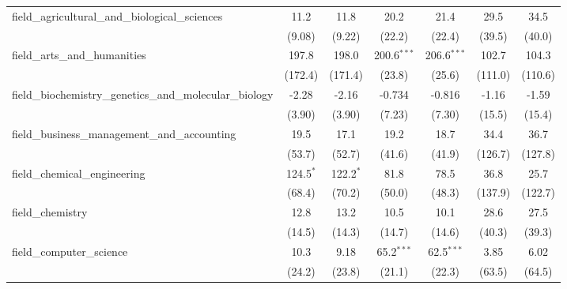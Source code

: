 \begin{tabular}{lcccccc}
   field\_agricultural\_and\_biological\_sciences              & 11.2         & 11.8         & 20.2           & 21.4           & 29.5    & 34.5\\   
                                                               & (9.08)       & (9.22)       & (22.2)         & (22.4)         & (39.5)  & (40.0)\\   
   field\_arts\_and\_humanities                                & 197.8        & 198.0        & 200.6$^{***}$  & 206.6$^{***}$  & 102.7   & 104.3\\   
                                                               & (172.4)      & (171.4)      & (23.8)         & (25.6)         & (111.0) & (110.6)\\   
   field\_biochemistry\_genetics\_and\_molecular\_biology      & -2.28        & -2.16        & -0.734         & -0.816         & -1.16   & -1.59\\   
                                                               & (3.90)       & (3.90)       & (7.23)         & (7.30)         & (15.5)  & (15.4)\\   
   field\_business\_management\_and\_accounting                & 19.5         & 17.1         & 19.2           & 18.7           & 34.4    & 36.7\\   
                                                               & (53.7)       & (52.7)       & (41.6)         & (41.9)         & (126.7) & (127.8)\\   
   field\_chemical\_engineering                                & 124.5$^{*}$  & 122.2$^{*}$  & 81.8           & 78.5           & 36.8    & 25.7\\   
                                                               & (68.4)       & (70.2)       & (50.0)         & (48.3)         & (137.9) & (122.7)\\   
   field\_chemistry                                            & 12.8         & 13.2         & 10.5           & 10.1           & 28.6    & 27.5\\   
                                                               & (14.5)       & (14.3)       & (14.7)         & (14.6)         & (40.3)  & (39.3)\\   
   field\_computer\_science                                    & 10.3         & 9.18         & 65.2$^{***}$   & 62.5$^{***}$   & 3.85    & 6.02\\   
                                                               & (24.2)       & (23.8)       & (21.1)         & (22.3)         & (63.5)  & (64.5)\\   

\end{tabular}
